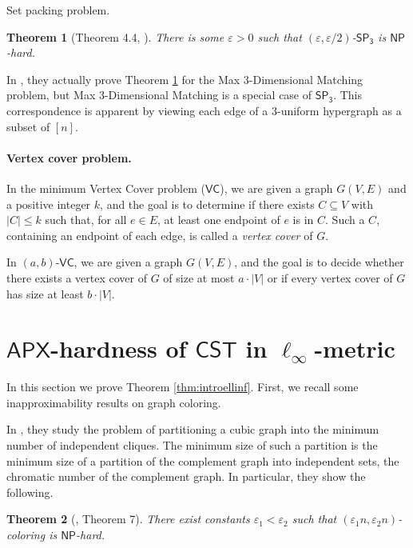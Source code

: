 \documentclass{article}\providecommand{\DeclareRedundantLanguages}[2]{}\usepackage[a4paper,margin=20mm]{geometry}
\newtheorem{theorem}{Theorem}\newtheorem{lemma}[theorem]{Lemma}\newtheorem{proposition}[theorem]{Proposition}\newtheorem{corollary}[theorem]{Corollary}\newtheorem{definition}[theorem]{Definition}\newtheorem{claim}[theorem]{Claim}\newtheorem{remark}[theorem]{Remark}\newtheorem{observation}[theorem]{Observation}\newtheorem{conjecture}[theorem]{Conjecture}\newtheorem{example}[theorem]{Example}
\newcommand{\1}{\textbf{1}}
\newcommand{\cst}{$\mathsf{CST}$\xspace}
\newcommand{\setpT}{$\mathsf{SP_3}$\xspace}
\newcommand{\np}{$\mathsf{NP}$\xspace}
\newcommand{\apx}{$\mathsf{APX}$\xspace}
\newcommand{\vcov}{$\mathsf{VC}$\xspace}
\begin{document}
\begin{paragraph}{Set packing problem.}
\begin{theorem}[Theorem 4.4, \cite{Petrank_1994}] \label{thm: triangle cov hardness}
There is some $\varepsilon > 0$ such that $(\varepsilon, \varepsilon/2)$-\setpT is \np-hard.
\end{theorem}

In \cite{Petrank_1994}, they actually prove Theorem \ref{thm: triangle cov hardness} for the Max 3-Dimensional Matching problem, but Max 3-Dimensional Matching is a special case of \setpT. This correspondence is apparent by viewing each edge of a $3$-uniform hypergraph as a subset of $[n]$.
\end{paragraph}

\paragraph{Vertex cover problem.} In the minimum Vertex Cover problem (\vcov), we are given a graph $G(V,E)$ and a positive integer $k$, and the goal is to determine if there exists $C \subseteq V$ with $|C| \leq k$ such that, for all $e \in E$, at least one endpoint of $e$ is in ${C}$. Such a $C$, containing an endpoint of each edge, is called a \textit{vertex cover} of $G$.

In $(a, b)$-\vcov, we are given a graph $G(V,E)$, and the goal is to decide whether there exists a vertex cover of $G$ of size at most $a \cdot |V|$ or if every vertex cover of $G$ has size at least $b \cdot |V|$.





\section{\texorpdfstring{\apx-hardness of \cst in $\ell_\infty$-metric}{APX-hardness of CST in linf-metric}} \label{sec: l_inf cst hardness}

In this section we prove Theorem \ref{thm:introellinf}. First, we recall some inapproximability results on graph coloring. 


In \cite{Cerioli_Faria_Ferreira_Martinhon_Protti_Reed_2008}, they study the problem of partitioning a cubic graph into the minimum number of independent cliques. The minimum size of such a partition is the minimum size of a partition of the complement graph into independent sets, the chromatic number of the complement graph. In particular, they show the following.
\begin{theorem}[\cite{Cerioli_Faria_Ferreira_Martinhon_Protti_Reed_2008}, Theorem 7] \label{thm: hardness of linear chromatic number}
There exist constants $\varepsilon_1 < \varepsilon_2$ such that $(\varepsilon_1 n, \varepsilon_2 n)$-coloring is \np-hard. 
\end{theorem}
\end{document}
